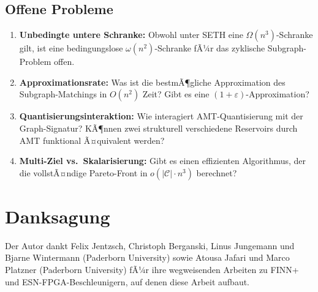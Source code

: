 ﻿\documentclass[a4paper,12pt]{article}
\theoremstyle{definition}
\begin{document}
\subsection{Offene Probleme}

\begin{enumerate}
    \item \textbf{Unbedingte untere Schranke:} Obwohl unter SETH eine $\Omega(n^3)$-Schranke
          gilt, ist eine bedingungslose $\omega(n^2)$-Schranke fÃ¼r das zyklische Subgraph-Problem
          offen.
    
    \item \textbf{Approximationsrate:} Was ist die bestmÃ¶gliche Approximation des
          Subgraph-Matchings in $O(n^2)$ Zeit? Gibt es eine $(1+\varepsilon)$-Approximation?
    
    \item \textbf{Quantisierungsinteraktion:} Wie interagiert AMT-Quantisierung mit der
          Graph-Signatur? KÃ¶nnen zwei strukturell verschiedene Reservoirs durch AMT
          funktional Ã¤quivalent werden?
    
    \item \textbf{Multi-Ziel vs.\ Skalarisierung:} Gibt es einen effizienten Algorithmus,
          der die vollstÃ¤ndige Pareto-Front in $o(|\mathcal{C}| \cdot n^3)$ berechnet?
\end{enumerate}

\section*{Danksagung}

Der Autor dankt Felix Jentzsch, Christoph Berganski, Linus Jungemann und Bjarne Wintermann
(Paderborn University) sowie Atousa Jafari und Marco Platzner (Paderborn University)
fÃ¼r ihre wegweisenden Arbeiten zu FINN+ und ESN-FPGA-Beschleunigern,
auf denen diese Arbeit aufbaut.
\end{document}
